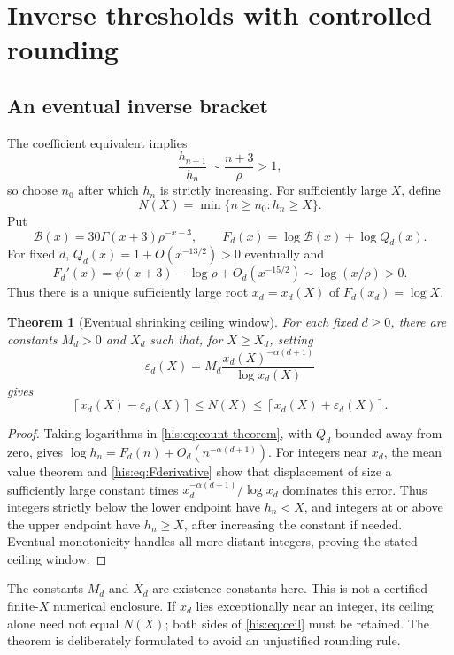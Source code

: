 \documentclass[11pt]{article}
\newtheorem{theorem}{Theorem}[section]
\theoremstyle{remark}\newtheorem{remark}[theorem]{Remark}
\newcommand{\eps}{\varepsilon}
\numberwithin{equation}{section}
\begin{document}
\section{Inverse thresholds with controlled rounding}\label{his:sec:inverse}
\subsection{An eventual inverse bracket}
The coefficient equivalent implies
\[
 \frac{h_{n+1}}{h_n}\sim\frac{n+3}{\rho}>1,
\]
so choose $n_0$ after which $h_n$ is strictly increasing. For sufficiently large $X$, define
\begin{equation}\label{his:eq:inverse}
 N(X)=\min\{n\ge n_0:h_n\ge X\}.
\end{equation}
Put
\begin{equation}\label{his:eq:Fd}
 \mathcal B(x)=30\Gamma(x+3)\rho^{-x-3},\qquad
 F_d(x)=\log\mathcal B(x)+\log Q_d(x).
\end{equation}
For fixed $d$, $Q_d(x)=1+O(x^{-13/2})>0$ eventually and
\begin{equation}\label{his:eq:Fderivative}
 F_d'(x)=\psi(x+3)-\log\rho+O_d(x^{-15/2})
 \sim\log(x/\rho)>0.
\end{equation}
Thus there is a unique sufficiently large root $x_d=x_d(X)$ of $F_d(x_d)=\log X$.

\begin{theorem}[Eventual shrinking ceiling window]\label{his:thm:inverse}
For each fixed $d\ge0$, there are constants $M_d>0$ and $X_d$ such that, for $X\ge X_d$, setting
\begin{equation}\label{his:eq:epsilon-inverse}
 \eps_d(X)=M_d\frac{x_d(X)^{-\alpha(d+1)}}{\log x_d(X)}
\end{equation}
gives
\begin{equation}\label{his:eq:ceil}
 \left\lceil x_d(X)-\eps_d(X)\right\rceil
 \le N(X)\le
 \left\lceil x_d(X)+\eps_d(X)\right\rceil.
\end{equation}
\end{theorem}
\begin{proof}
Taking logarithms in \eqref{his:eq:count-theorem}, with $Q_d$ bounded away from zero, gives
$\log h_n=F_d(n)+O_d(n^{-\alpha(d+1)})$.
For integers near $x_d$, the mean value theorem and \eqref{his:eq:Fderivative} show that displacement of size a sufficiently large constant times
$x_d^{-\alpha(d+1)}/\log x_d$ dominates this error. Thus integers strictly below the lower endpoint have $h_n<X$, and integers at or above the upper endpoint have $h_n\ge X$, after increasing the constant if needed. Eventual monotonicity handles all more distant integers, proving the stated ceiling window.
\end{proof}
The constants $M_d$ and $X_d$ are existence constants here. This is not a certified finite-$X$ numerical enclosure. If $x_d$ lies exceptionally near an integer, its ceiling alone need not equal $N(X)$; both sides of \eqref{his:eq:ceil} must be retained. The theorem is deliberately formulated to avoid an unjustified rounding rule.
\end{document}
